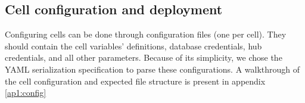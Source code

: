 \subsection{Cell configuration and deployment}


Configuring cells can be done through configuration files (one per cell). They should contain the cell variables' definitions, database credentials, hub credentials, and all other parameters. Because of its simplicity, we chose the YAML serialization specification \cite{yaml} to parse these configurations. A walkthrough of the cell configuration and expected file structure is present in appendix \ref{ap1:config}


